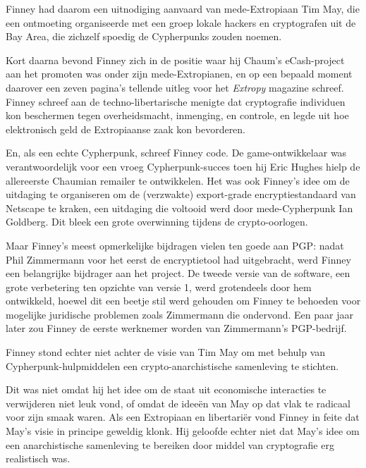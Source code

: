 \documentclass[
  a5paper,
  smalldemyvopaper,11pt,twoside,onecolumn,openright,extrafontsizes]{memoir}
\begin{document}
Finney had daarom een uitnodiging aanvaard van mede-Extropiaan Tim May,
die een ontmoeting organiseerde met een groep lokale hackers en
cryptografen uit de Bay Area, die zichzelf spoedig de Cypherpunks zouden
noemen.

Kort daarna bevond Finney zich in de positie waar hij Chaum's
eCash-project aan het promoten was onder zijn mede-Extropianen, en op
een bepaald moment daarover een zeven pagina's tellende uitleg voor het
\emph{Extropy} magazine schreef. Finney schreef aan de
techno-libertarische menigte dat cryptografie individuen kon beschermen
tegen overheidsmacht, inmenging, en controle, en legde uit hoe
elektronisch geld de Extropiaanse zaak kon bevorderen.

En, als een echte Cypherpunk, schreef Finney code. De game-ontwikkelaar
was verantwoordelijk voor een vroeg Cypherpunk-succes toen hij Eric
Hughes hielp de allereerste Chaumian remailer te ontwikkelen. Het was
ook Finney's idee om de uitdaging te organiseren om de (verzwakte)
export-grade encryptiestandaard van Netscape te kraken, een uitdaging
die voltooid werd door mede-Cypherpunk Ian Goldberg. Dit bleek een grote
overwinning tijdens de crypto-oorlogen.

Maar Finney's meest opmerkelijke bijdragen vielen ten goede aan PGP:
nadat Phil Zimmermann voor het eerst de encryptietool had uitgebracht,
werd Finney een belangrijke bijdrager aan het project. De tweede versie
van de software, een grote verbetering ten opzichte van versie 1, werd
grotendeels door hem ontwikkeld, hoewel dit een beetje stil werd
gehouden om Finney te behoeden voor mogelijke juridische problemen zoals
Zimmermann die ondervond. Een paar jaar later zou Finney de eerste
werknemer worden van Zimmermann's PGP-bedrijf.

Finney stond echter niet achter de visie van Tim May om met behulp van
Cypherpunk-hulpmiddelen een crypto-anarchistische samenleving te
stichten.

Dit was niet omdat hij het idee om de staat uit economische interacties
te verwijderen niet leuk vond, of omdat de ideeën van May op dat vlak te
radicaal voor zijn smaak waren. Als een Extropiaan en libertariër vond
Finney in feite dat May's visie in principe geweldig klonk. Hij geloofde
echter niet dat May's idee om een anarchistische samenleving te bereiken
door middel van cryptografie erg realistisch was.
\end{document}
